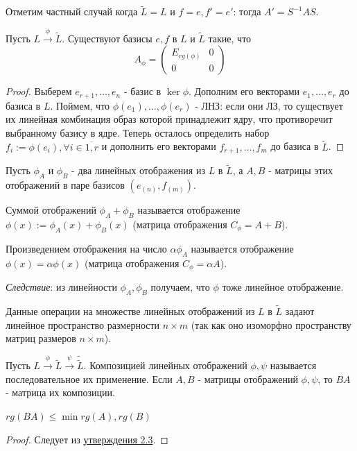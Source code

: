\label{A'} Отметим частный случай когда $\tilde{L}=L$ и $f=e, f'=e'$: тогда $A'=S^{-1}AS$.
\begin{theorem}
    Пусть $L\overset{\phi} \to \tilde{L}$. Существуют базисы $e, f$ в $L$ и $\tilde{L}$ такие, что \[A_{\phi}=\left(
    \begin{array}{c|c}
    E_{rg(\phi)} & 0 \\
    \hline
    0 & 0
    \end{array}
\right)\]
\end{theorem}
\begin{proof}
    Выберем $e_{r+1}, \dots, e_{n}$ - базис в $\ker \phi$. Дополним его векторами $e_1, \dots, e_r$ до базиса в $L$. Поймем, что $\phi(e_1), \dots, \phi(e_r)$ - ЛНЗ: если они ЛЗ, то существует их линейная комбинация образ которой принадлежит ядру, что противоречит выбранному базису в ядре. Теперь осталось определить набор $f_i:=\phi(e_i), \forall i \in \overline{1,r}$ и дополнить его векторами $f_{r+1}, \dots, f_{m}$ до базиса в $\tilde{L}$.
\end{proof}
Пусть $\phi_A$ и $\phi_B$ - два линейных отображения из $L$ в $\tilde{L}$, а $A, B$ - матрицы этих отображений в паре базисов $(e_{(n)}, f_{(m)})$.
\begin{definition}
    Суммой отображений $\phi_A+\phi_B$ называется отображение $\phi(x):=\phi_A(x)+\phi_B(x)$ (матрица отображения $C_{\phi}=A+B$).
\end{definition}
\begin{definition}
    Произведением отображения на число $\alpha\phi_A$ называется отображение $\phi(x)=\alpha\phi(x)$ (матрица отображения $C_{\phi}=\alpha A$).
\end{definition}
\textit{Следствие}: из линейности $\phi_A, \phi_B$ получаем, что $\phi$ тоже линейное отображение.

Данные операции на множестве линейных отображений из $L$ в $\tilde{L}$ задают линейное пространство размерности $n\times m$ (так как оно изоморфно пространству матриц размеров $n \times m$).

Пусть $L\overset{\phi} \to \tilde{L} \overset{\psi} \to \tilde{\tilde{L}}$. Композицией линейных отображений $\phi, \psi$ называется последовательное их применение. Если $A, B$ - матрицы отображений $\phi, \psi$, то $BA$ - матрица их композиции.
\begin{theorem}
    $rg(BA) \leqslant \min rg(A), rg(B)$
\end{theorem}
\begin{proof}
    Следует из \hyperref[rgleq]{утверждения 2.3}.
\end{proof}

